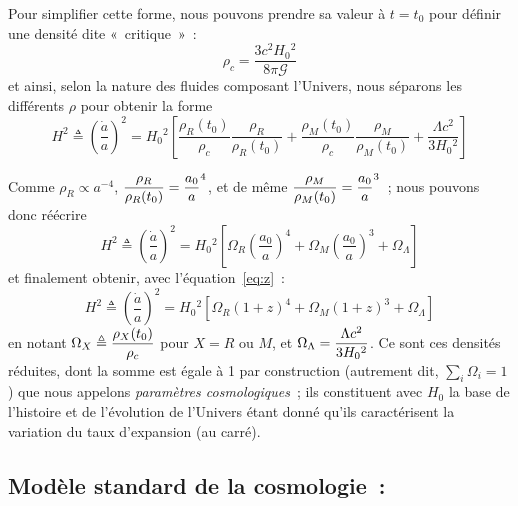 \documentclass[../main/main.tex]{subfiles}
\begin{document}
Pour simplifier cette forme, nous pouvons prendre sa valeur à $t = t_0$ pour
définir une densité dite «~critique~»~:
\begin{equation}
    \rho_c = \frac{3c^2H_0{}^2}{8\pi\mathcal{G}}
\end{equation}
et ainsi, selon la nature des fluides composant l'Univers, nous séparons les
différents $\rho$ pour obtenir la forme
\begin{equation}
    H^2 \triangleq \left( \frac{\dot{a}}{a} \right)^2 =
    H_0{}^2 \left[ \frac{\rho_R(t_0)}{\rho_c}\frac{\rho_R}{\rho_R(t_0)} +
                   \frac{\rho_M(t_0)}{\rho_c}\frac{\rho_M}{\rho_M(t_0)} +
                   \frac{\Lambda c^2}{3 H_0{}^2}
               \right]
\end{equation}

Comme $\rho_R \propto a^{-4}$, $\displaystyle\frac{\rho_R}{\rho_R(t_0)} =
\frac{a_0}{a}^4$, et de même $\displaystyle\frac{\rho_M}{\rho_M(t_0)} = \frac{a_0}{a}^3$~;
nous pouvons donc réécrire
\begin{equation}
    H^2 \triangleq \left( \frac{\dot{a}}{a} \right)^2 =
        H_0{}^2 \left[ \Omega_R \left( \frac{a_0}{a} \right)^4 +
                       \Omega_M \left( \frac{a_0}{a} \right)^3 +
                       \Omega_\Lambda \right]
\end{equation}
et finalement obtenir, avec l'équation~\ref{eq:z}~:
\begin{equation}\label{eq:h2}
    H^2 \triangleq \left( \frac{\dot{a}}{a} \right)^2 =
        H_0{}^2 \left[ \Omega_R \left( 1+z \right)^4 +
                       \Omega_M \left( 1+z \right)^3 +
                       \Omega_\Lambda \right]
\end{equation}
en notant $\Omega_X \triangleq \displaystyle \frac{\rho_X(t_0)}{\rho_c}$ pour $X = R$ ou
$M$, et $\Omega_\Lambda = \displaystyle \frac{\Lambda c^2}{3 H_0{}^2}$. Ce sont ces
densités réduites, dont la somme est égale à 1 par construction (autrement dit,
$\sum_i \Omega_i = 1$) que nous appelons \textit{paramètres cosmologiques}~; ils
constituent avec $H_0$ la base de l'histoire et de l'évolution de l'Univers
étant donné qu'ils caractérisent la variation du taux d'expansion (au carré).

\subsection{Modèle standard de la cosmologie~: \lcdm}\label{sec:MS}
\end{document}
